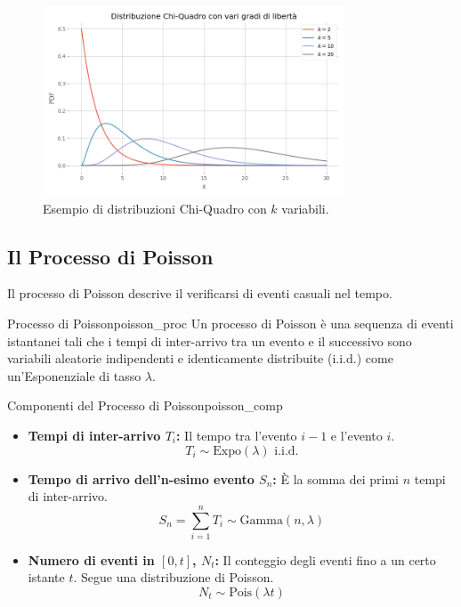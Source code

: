\begin{figure}[H]
    \centering
    \includegraphics[width=0.8\textwidth]{images/th_01_03/chi2.png}
    \caption{Esempio di distribuzioni Chi-Quadro con \(k\) variabili.}
    \label{fig:chi2}
\end{figure}

\subsection{Il Processo di Poisson}
Il processo di Poisson descrive il verificarsi di eventi casuali nel tempo.

\begin{definizione}{Processo di Poisson}{poisson_proc}
Un processo di Poisson è una sequenza di eventi istantanei tali che i tempi di inter-arrivo tra un evento e il successivo sono variabili aleatorie indipendenti e identicamente distribuite (i.i.d.) come un'Esponenziale di tasso \(\lambda\).
\end{definizione}

\begin{proposizione}{Componenti del Processo di Poisson}{poisson_comp}
\begin{itemize}
    \item \textbf{Tempi di inter-arrivo \(T_i\):} Il tempo tra l'evento \(i-1\) e l'evento \(i\).
    \[ T_i \sim \text{Expo}(\lambda) \text{ i.i.d.} \]
    \item \textbf{Tempo di arrivo dell'n-esimo evento \(S_n\):} È la somma dei primi \(n\) tempi di inter-arrivo.
    \[ S_n = \sum_{i=1}^n T_i \sim \text{Gamma}(n, \lambda) \]
    \item \textbf{Numero di eventi in \([0, t]\), \(N_t\):} Il conteggio degli eventi fino a un certo istante \(t\). Segue una distribuzione di Poisson.
    \[ N_t \sim \text{Pois}(\lambda t) \]
\end{itemize}
\end{proposizione}

